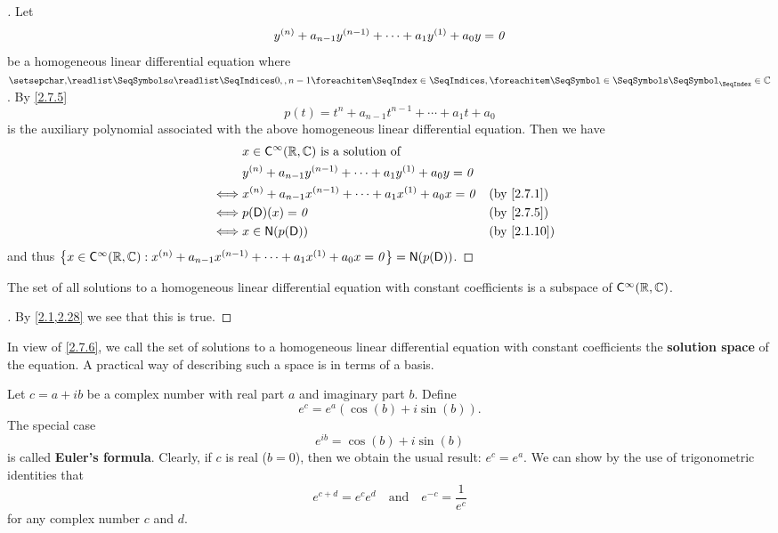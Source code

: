 \begin{proof}[]
  Let
  \[
    y^{(n)} + a_{n - 1} y^{(n - 1)} + \cdots + a_1 y^{(1)} + a_0 y = \mathit{0}
  \]
  be a homogeneous linear differential equation where \(\seq{a}{0,,n-1} \in \C\).
  By \cref{2.7.5}
  \[
    p(t) = t^n + a_{n - 1} t^{n - 1} + \cdots + a_1 t + a_0
  \]
  is the auxiliary polynomial associated with the above homogeneous linear differential equation.
  Then we have
  \begin{align*}
         & x \in \cfs[\infty](\R, \C) \text{ is a solution of }                                                \\
         & y^{(n)} + a_{n - 1} y^{(n - 1)} + \cdots + a_1 y^{(1)} + a_0 y = \zv                                \\
    \iff & x^{(n)} + a_{n - 1} x^{(n - 1)} + \cdots + a_1 x^{(1)} + a_0 x = \zv &  & \text{(by \cref{2.7.1})}  \\
    \iff & p(\Dop)(x) = \zv                                                     &  & \text{(by \cref{2.7.5})}  \\
    \iff & x \in \ns{p(\Dop)}                                                   &  & \text{(by \cref{2.1.10})}
  \end{align*}
  and thus \(\set{x \in \cfs[\infty](\R, \C) : x^{(n)} + a_{n - 1} x^{(n - 1)} + \cdots + a_1 x^{(1)} + a_0 x = \zv} = \ns{p(\Dop)}\).
\end{proof}

\begin{cor}\label{2.7.6}
  The set of all solutions to a homogeneous linear differential equation with constant coefficients is a subspace of \(\cfs[\infty](\R, \C)\).
\end{cor}

\begin{proof}[]
  By \cref{2.1,2.28} we see that this is true.
\end{proof}

\begin{defn}\label{2.7.7}
  In view of \cref{2.7.6}, we call the set of solutions to a homogeneous linear differential equation with constant coefficients the \textbf{solution space} of the equation.
  A practical way of describing such a space is in terms of a basis.
\end{defn}

\begin{defn}\label{2.7.8}
  Let \(c = a + ib\) be a complex number with real part \(a\) and imaginary part \(b\).
  Define
  \[
    e^c = e^a (\cos(b) + i \sin(b)).
  \]
  The special case
  \[
    e^{ib} = \cos(b) + i \sin(b)
  \]
  is called \textbf{Euler's formula}.
  Clearly, if \(c\) is real (\(b = 0\)), then we obtain the usual result:
  \(e^c = e^a\).
  We can show by the use of trigonometric identities that
  \[
    e^{c + d} = e^c e^d \quad \text{and} \quad e^{-c} = \frac{1}{e^c}
  \]
  for any complex number \(c\) and \(d\).
\end{defn}

